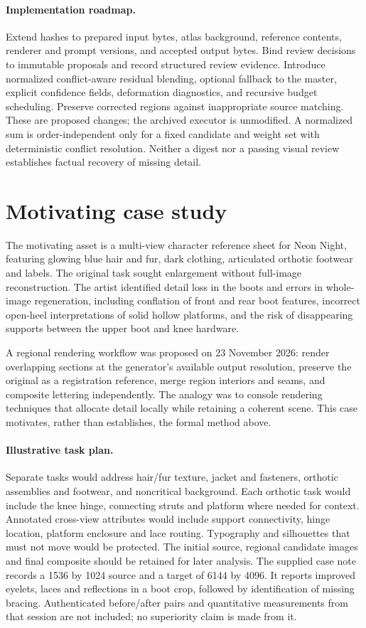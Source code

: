 \documentclass[10pt,twocolumn]{article}
\begin{document}
\paragraph{Implementation roadmap.} Extend hashes to prepared input bytes, atlas background, reference contents, renderer and prompt versions, and accepted output bytes. Bind review decisions to immutable proposals and record structured review evidence. Introduce normalized conflict-aware residual blending, optional fallback to the master, explicit confidence fields, deformation diagnostics, and recursive budget scheduling. Preserve corrected regions against inappropriate source matching. These are proposed changes; the archived executor is unmodified. A normalized sum is order-independent only for a fixed candidate and weight set with deterministic conflict resolution. Neither a digest nor a passing visual review establishes factual recovery of missing detail.
\section{Motivating case study}
The motivating asset is a multi-view character reference sheet for Neon Night, featuring glowing blue hair and fur, dark clothing, articulated orthotic footwear and labels. The original task sought enlargement without full-image reconstruction. The artist identified detail loss in the boots and errors in whole-image regeneration, including conflation of front and rear boot features, incorrect open-heel interpretations of solid hollow platforms, and the risk of disappearing supports between the upper boot and knee hardware.

A regional rendering workflow was proposed on 23 November 2026: render overlapping sections at the generator's available output resolution, preserve the original as a registration reference, merge region interiors and seams, and composite lettering independently. The analogy was to console rendering techniques that allocate detail locally while retaining a coherent scene. This case motivates, rather than establishes, the formal method above.

\paragraph{Illustrative task plan.} Separate tasks would address hair/fur texture, jacket and fasteners, orthotic assemblies and footwear, and noncritical background. Each orthotic task would include the knee hinge, connecting struts and platform where needed for context. Annotated cross-view attributes would include support connectivity, hinge location, platform enclosure and lace routing. Typography and silhouettes that must not move would be protected. The initial source, regional candidate images and final composite should be retained for later analysis. The supplied case note records a 1536 by 1024 source and a target of 6144 by 4096. It reports improved eyelets, laces and reflections in a boot crop, followed by identification of missing bracing. Authenticated before/after pairs and quantitative measurements from that session are not included; no superiority claim is made from it.
\end{document}
